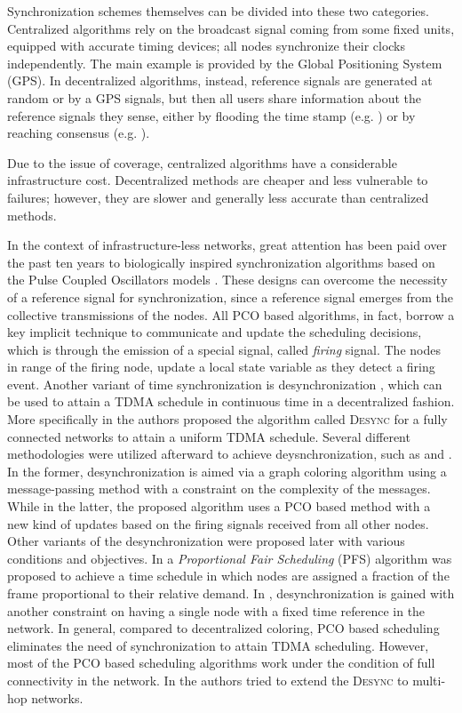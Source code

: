 \documentclass[conference]{IEEEtran}
\theoremstyle{definition}
\theoremstyle{definition}
\begin{document}
Synchronization schemes themselves can be divided into these two categories. Centralized algorithms rely on the broadcast signal coming from some fixed units, equipped with accurate timing devices; all nodes synchronize their clocks independently. The main example is provided by the Global Positioning System (GPS). 
In decentralized algorithms, instead, reference signals are generated at random or by a GPS signals, but then all users share information about the reference signals they sense, either by flooding the time stamp (e.g. \cite{MaKuSiLe04}) or by reaching consensus (e.g. \cite{ElGiEs02}). 

Due to the issue of coverage, centralized algorithms have a considerable infrastructure cost.
Decentralized methods are cheaper and less vulnerable to failures; however, they are slower and generally less accurate than centralized methods.  



In the context of infrastructure-less networks, great attention has been paid over the past ten years to biologically inspired synchronization algorithms based on the Pulse Coupled Oscillators models \cite{strogatz2003sync}. These designs can overcome the
necessity of a reference signal for synchronization, since a reference signal emerges from the collective transmissions of the nodes. 
All PCO based algorithms, in fact, borrow a key implicit technique to communicate and update the scheduling decisions, which is through the emission of a special signal, called {\it firing} signal.
The nodes in range of the firing node, update a local state variable as they detect a firing event. Another variant of time synchronization is desynchronization \cite{nagpal}, which can be used to attain a TDMA schedule in continuous time in a decentralized fashion.  More specifically in \cite{nagpal} the authors proposed the algorithm called \textsc{Desync}  for a fully connected networks to attain a uniform TDMA schedule. Several different methodologies were utilized afterward to achieve deysnchronization, such as \cite{motskin2009lightweight} and \cite{Choochaisri2012}. In the former, desynchronization is aimed via a graph coloring algorithm using a message-passing method with a constraint on the complexity of the messages. While in the latter, the proposed algorithm uses a PCO based method with a new kind of updates based on the firing signals received from all other nodes. Other variants of the desynchronization were proposed later with various conditions and objectives. In \cite{pfs}  a \emph{Proportional Fair Scheduling} (PFS) algorithm was proposed to achieve a time schedule in which nodes are assigned a fraction of the frame proportional to their relative demand.  In \cite{anchored}, desynchronization is gained with another constraint on having a single node with a fixed time reference in the network. In general, compared to decentralized coloring, PCO based scheduling eliminates the need of synchronization to attain TDMA scheduling. However, most of the PCO based scheduling algorithms work under the condition of full connectivity in the network. In \cite{degesys2008towards} the authors tried to extend the \textsc{Desync} to multi-hop networks. 
\end{document}
